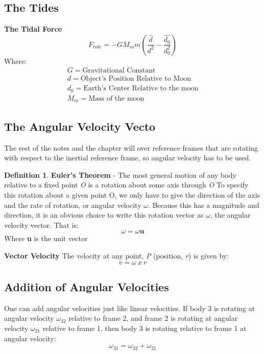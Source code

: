 \documentclass[11pt]{article}
\theoremstyle{definition}
\newtheorem{defn}{Definition}
\begin{document}
\subsection{The Tides}
\begin{shaded}
\textbf{The Tidal Force} \newline
\begin{equation}
F_{tide} = -GM_mm(\frac{\hat{d}}{d^2}-\frac{\hat{d_0}}{d_0^2})
\end{equation}
Where:
\begin{equation*}
\begin{split}
G = \text{Gravitational Constant} \\
d = \text{Object's Position Relative to Moon} \\
d_0 = \text{Earth's Center Relative to the moon}\\
M_m = \text{Mass of the moon}
\end{split}
\end{equation*}
\end{shaded}
\newpage
\subsection{The Angular Velocity Vecto}
The rest of the notes and the chapter will over reference frames that are rotating with respect to the inertial reference frame, so angular velocity has to be used. 
\begin{defn}
\textbf{Euler's Theorem} - The most general motion of any body relative to a fixed point \textit{O} is a rotation about some axis through \textit{O} To specify this rotation about a given point O, we only have to give the direction of the axis and the rate of rotation, or angular velocity $\omega$. Because this has a magnitude and direction, it is an obvious choice to write this rotation vector as $\omega$, the angular velocity vector. That is:
\begin{equation}
\omega = \omega\textbf{u}
\end{equation}
Where \textbf{u} is the unit vector
\end{defn}
\begin{shaded}
\textbf{Vector Velocity}\newline
The velocity at any point, \textit{P} (position, \textit{r}) is given by:
\begin{equation}
v = \omega\  x \ r
\end{equation}
\end{shaded}
\subsection*{Addition of Angular Velocities}
One can add angular velocities just like linear velocities. If body 3 is rotating at angular velocity $\omega_{32}$ relative to frame 2, and frame 2 is rotating at angular velocity $\omega_{21}$ relative to frame 1, then body 3 is rotating relative to frame 1 at angular velocity: 
\begin{equation}
\omega_{31} = \omega_{32} + \omega_{21}
\end{equation}
\end{document}
